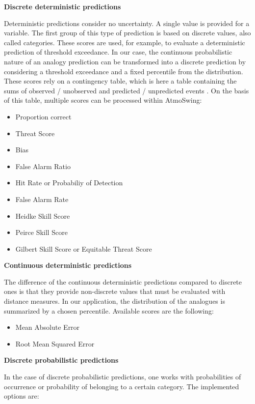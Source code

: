 \documentclass[review]{elsarticle}
\begin{document}
\textbf{Discrete deterministic predictions}

Deterministic predictions consider no uncertainty. A single value is provided for a variable. The first group of this type of prediction is based on discrete values, also called categories. These scores are used, for example, to evaluate a deterministic prediction of threshold exceedance. In our case, the continuous probabilistic nature of an analogy prediction can be transformed into a discrete prediction by considering a threshold exceedance and a fixed percentile from the distribution. These scores rely on a contingency table, which is here a table containing the sums of observed / unobserved and predicted / unpredicted events \citep{Wilks2006}. On the basis of this table, multiple scores can be processed within AtmoSwing:

\begin{itemize}
	\setlength\itemsep{-1mm}
	\item Proportion correct \citep{Finley1884}
	\item Threat Score \citep{Gilbert1884}
	\item Bias
	\item False Alarm Ratio
	\item Hit Rate or Probabiliy of Detection
	\item False Alarm Rate
	\item Heidke Skill Score \citep{Heidke1926}
	\item Peirce Skill Score \citep{Peirce1884}
	\item Gilbert Skill Score or Equitable Threat Score \citep{Gilbert1884}
\end{itemize}


\textbf{Continuous deterministic predictions}

The difference of the continuous deterministic predictions compared to discrete ones is that they provide non-discrete values that must be evaluated with distance measures. In our application, the distribution of the analogues is summarized by a chosen percentile. Available scores are the following:

\begin{itemize}
	\setlength\itemsep{-1mm}
	\item Mean Absolute Error
	\item Root Mean Squared Error
\end{itemize}


\textbf{Discrete probabilistic predictions}

In the case of discrete probabilistic predictions, one works with probabilities of occurrence or probability of belonging to a certain category. The implemented options are:
\end{document}
